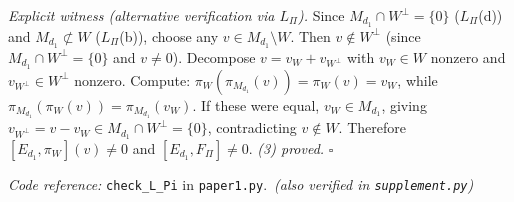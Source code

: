 \documentclass[11pt]{article}
\theoremstyle{remark}
\newcommand{\coderef}[2]{\smallskip\noindent\textit{Code reference:} \texttt{#1} in \texttt{#2}.}
\begin{document}
\begin{tcolorbox}[apfbox, title={Corollary of $L_\Pi$ (Joint Enforcement is Not Diagonal)}]
\smallskip\noindent\textit{Explicit witness (alternative verification via $L_\Pi$).}  Since $M_{d_1} \cap W^\perp = \{0\}$ ($L_\Pi$(d)) and $M_{d_1} \not\subset W$ ($L_\Pi$(b)), choose any $v \in M_{d_1} \setminus W$.  Then $v \notin W^\perp$ (since $M_{d_1} \cap W^\perp = \{0\}$ and $v \ne 0$).  Decompose $v = v_W + v_{W^\perp}$ with $v_W \in W$ nonzero and $v_{W^\perp} \in W^\perp$ nonzero.  Compute: $\pi_W(\pi_{M_{d_1}}(v)) = \pi_W(v) = v_W$, while $\pi_{M_{d_1}}(\pi_W(v)) = \pi_{M_{d_1}}(v_W)$.  If these were equal, $v_W \in M_{d_1}$, giving $v_{W^\perp} = v - v_W \in M_{d_1} \cap W^\perp = \{0\}$, contradicting $v \notin W$.  Therefore $[E_{d_1}, \pi_W](v) \ne 0$ and $[E_{d_1}, F_\Pi] \ne 0$. \hfill\textit{(3) proved.}  \hfill$\square$

\coderef{check\_L\_Pi}{paper1.py}\,%
\hspace{1em}\textit{(also verified in \texttt{supplement.py})}
\end{tcolorbox}
\end{document}
